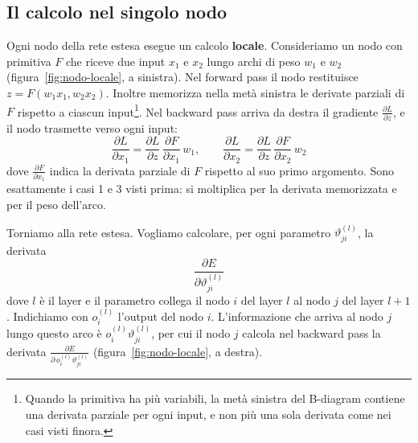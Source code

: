 \subsection{Il calcolo nel singolo nodo}
Ogni nodo della rete estesa esegue un calcolo \textbf{locale}. Consideriamo un nodo con primitiva $F$ che riceve due input $x_1$ e $x_2$ lungo archi di peso $w_1$ e $w_2$ (figura~\ref{fig:nodo-locale}, a sinistra). Nel forward pass il nodo restituisce $z = F(w_1x_1, w_2x_2)$. Inoltre memorizza nella metà sinistra le derivate parziali di $F$ rispetto a ciascun input\footnote{Quando la primitiva ha più variabili, la metà sinistra del B-diagram contiene una derivata parziale per ogni input, e non più una sola derivata come nei casi visti finora.}. Nel backward pass arriva da destra il gradiente $\frac{\partial L}{\partial z}$, e il nodo trasmette verso ogni input:
\[
\frac{\partial L}{\partial x_1} = \frac{\partial L}{\partial z}\,\frac{\partial F}{\partial x_1}\,w_1, \qquad \frac{\partial L}{\partial x_2} = \frac{\partial L}{\partial z}\,\frac{\partial F}{\partial x_2}\,w_2
\]
dove $\frac{\partial F}{\partial x_1}$ indica la derivata parziale di $F$ rispetto al suo primo argomento. Sono esattamente i casi 1 e 3 visti prima: si moltiplica per la derivata memorizzata e per il peso dell'arco.

Torniamo alla rete estesa. Vogliamo calcolare, per ogni parametro $\vartheta_{ji}^{(l)}$, la derivata
\[
\frac{\partial E}{\partial \vartheta_{ji}^{(l)}}
\]
dove $l$ è il layer e il parametro collega il nodo $i$ del layer $l$ al nodo $j$ del layer $l+1$. Indichiamo con $o_i^{(l)}$ l'output del nodo $i$. L'informazione che arriva al nodo $j$ lungo questo arco è $o_i^{(l)}\vartheta_{ji}^{(l)}$, per cui il nodo $j$ calcola nel backward pass la derivata $\frac{\partial E}{\partial\, o_i^{(l)}\vartheta_{ji}^{(l)}}$ (figura~\ref{fig:nodo-locale}, a destra).

